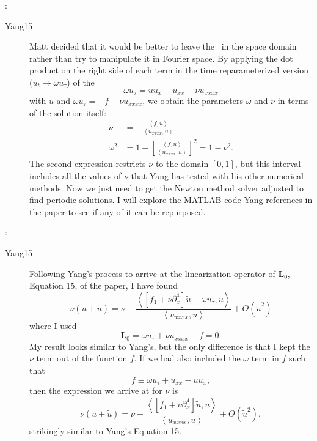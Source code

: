 \begin{description}
{ :
\begin{description}
\item[Yang15]
Matt decided that it would be better to leave the \KSe\ in the space domain
rather than try to manipulate it in Fourier space. By applying the dot product on
the right side of each term in the time reparameterized version
($u_t \to \omega u_{\tau}$) of the \KSe\
\begin{equation}
    \omega u_{\tau} = u u_x - u_{xx} - \nu u_{xxxx}
\end{equation}
with $u$ and $\omega u_{\tau} = -f - \nu u_{xxxx}$, we obtain the parameters
$\omega$ and $\nu$ in terms of the solution itself:
\begin{align}
    \nu &= -\frac{\left< f, u \right>}{\left< u_{xxxx}, u \right>}\\
    \omega^2 &= 1 - \left[ \frac{\left< f, u \right>}{\left< u_{xxxx}, u \right>} \right]^2 = 1 - \nu^2.
\end{align}
The second expression restricts $\nu$ to the domain $[0,1]$, but this interval
includes all the values of $\nu$ that Yang has tested with his other numerical
methods. Now we just need to get the Newton method solver adjusted to find periodic
solutions. I will explore the MATLAB code Yang references in the paper to see
if any of it can be repurposed.

\end{description}
}

{ :
\begin{description}
\item[Yang15]
Following Yang's process to arrive at the linearization operator of $\mathbf{L}_0$,
Equation 15, of the paper, I have found
\begin{equation}
    \nu(u + \tilde{u}) = \nu - \frac{\left< \left[f_1 + \nu \partial_x^4 \right] \tilde{u} - \omega u_{\tau}, u \right>}{\left< u_{xxxx}, u \right>} + O(\tilde{u}^2)
\end{equation}
where I used
\begin{equation}
    \mathbf{L}_0 = \omega u_{\tau} + \nu u_{xxxx} + f = 0.
\end{equation}
My result looks similar to Yang's, but the only difference is that I kept the
$\nu$ term out of the function $f$. If we had also included the $\omega$ term
in $f$ such that
\begin{equation}
    f \equiv \omega u_{\tau} + u_{xx} - u u_x,
\end{equation}
then the expression we arrive at for $\nu$ is
\begin{equation}
    \nu(u + \tilde{u}) = \nu - \frac{\left< \left[f_1 + \nu \partial_x^4 \right] \tilde{u}, u \right>}{\left< u_{xxxx}, u \right>} + O(\tilde{u}^2),
\end{equation}
strikingly similar to Yang's Equation 15.

\end{description}
}


\end{description}

\printbibliography[heading=subbibintoc,title={References}]
